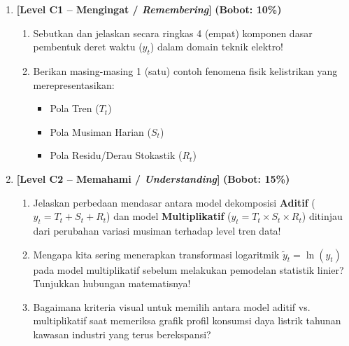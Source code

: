 \documentclass[11pt,a4paper]{article}
\begin{document}
\begin{enumerate}[leftmargin=1.5em, label=\textbf{Soal \arabic*.}]

    \item \textbf{[Level C1 -- Mengingat / \textit{Remembering}]} \hfill \textbf{(Bobot: 10\%)}
    \begin{enumerate}[label=\alph*.]
        \item Sebutkan dan jelaskan secara ringkas 4 (empat) komponen dasar pembentuk deret waktu ($y_t$) dalam domain teknik elektro!
        \item Berikan masing-masing 1 (satu) contoh fenomena fisik kelistrikan yang merepresentasikan:
        \begin{itemize}
            \item Pola Tren ($T_t$)
            \item Pola Musiman Harian ($S_t$)
            \item Pola Residu/Derau Stokastik ($R_t$)
        \end{itemize}
    \end{enumerate}

    \vspace{0.3cm}

    \item \textbf{[Level C2 -- Memahami / \textit{Understanding}]} \hfill \textbf{(Bobot: 15\%)}
    \begin{enumerate}[label=\alph*.]
        \item Jelaskan perbedaan mendasar antara model dekomposisi \textbf{Aditif} ($y_t = T_t + S_t + R_t$) dan model \textbf{Multiplikatif} ($y_t = T_t \times S_t \times R_t$) ditinjau dari perubahan variasi musiman terhadap level tren data!
        \item Mengapa kita sering menerapkan transformasi logaritmik $\tilde{y}_t = \ln(y_t)$ pada model multiplikatif sebelum melakukan pemodelan statistik linier? Tunjukkan hubungan matematisnya!
        \item Bagaimana kriteria visual untuk memilih antara model aditif vs. multiplikatif saat memeriksa grafik profil konsumsi daya listrik tahunan kawasan industri yang terus berekspansi?
    \end{enumerate}


\end{enumerate}
\end{document}
